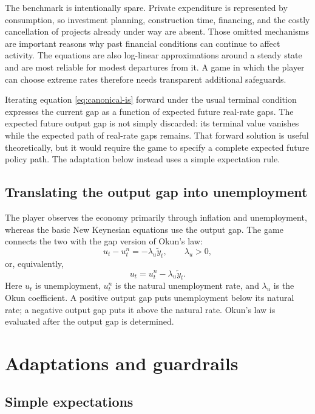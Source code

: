 \documentclass[11pt]{article}
\newcommand{\gap}{\widetilde y}
\begin{document}
The benchmark is intentionally spare.  Private expenditure is represented by
consumption, so investment planning, construction time, financing, and the
costly cancellation of projects already under way are absent.  Those omitted
mechanisms are important reasons why past financial conditions can continue to
affect activity.  The equations are also log-linear approximations around a
steady state and are most reliable for modest departures from it.  A game in
which the player can choose extreme rates therefore needs transparent
additional safeguards.

Iterating equation \eqref{eq:canonical-is} forward under the usual terminal
condition expresses the current gap as a function of expected future real-rate
gaps.  The expected future output gap is not simply discarded: its terminal
value vanishes while the expected path of real-rate gaps remains.  That forward
solution is useful theoretically, but it would require the game to specify a
complete expected future policy path.  The adaptation below instead uses a
simple expectation rule.

\subsection{Translating the output gap into unemployment}

The player observes the economy primarily through inflation and unemployment,
whereas the basic New Keynesian equations use the output gap.  The game connects
the two with the gap version of Okun's law:
\begin{equation}
  u_t-u_t^n=-\lambda_u\gap_t,
  \qquad \lambda_u>0,
  \label{eq:okun-gap}
\end{equation}
or, equivalently,
\begin{equation}
  u_t=u_t^n-\lambda_u\gap_t.
  \label{eq:okun-level}
\end{equation}
Here $u_t$ is unemployment, $u_t^n$ is the natural unemployment rate, and
$\lambda_u$ is the Okun coefficient.  A positive output gap puts unemployment
below its natural rate; a negative output gap puts it above the natural rate.
Okun's law is evaluated after the output gap is determined.

\section{Adaptations and guardrails}

\subsection{Simple expectations}
\end{document}
